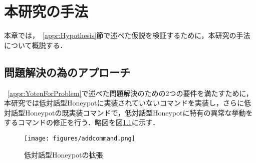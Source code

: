 \chapter{本研究の手法}
\label{meth}

本章では，~\ref{appr:Hypothesis}節で述べた仮説を検証するために，本研究の手法について概説する．

\section{問題解決の為のアプローチ}
\label{meth:appr}
 ~\ref{appr:YotenForProblem}で述べた問題解決のための2つの要件を満たすために，本研究では低対話型Honeypotに実装されていないコマンドを実装し，さらに低対話型Honeypotの既実装コマンドで，低対話型Honeypotに特有の異常な挙動をするコマンドの修正を行う．略図を図\ref{fig:addcommand}に示す．

\vspace{10mm}
\begin{figure}[htbp]
    \centering
    \texttt{[image: figures/addcommand.png]}
    \caption{低対話型Honeypotの拡張}
    \label{fig:addcommand}
\end{figure}
\vspace{10mm}

%



